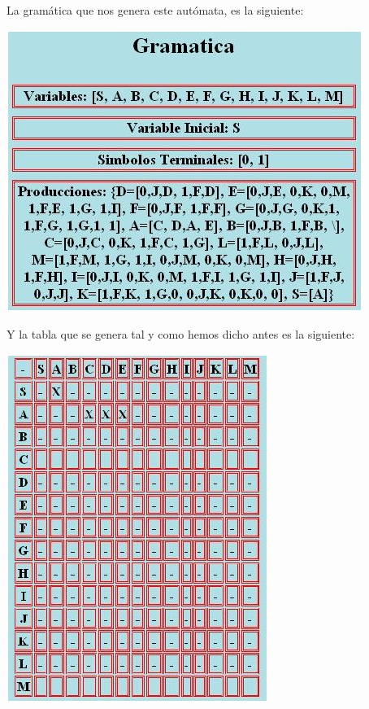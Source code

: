 \documentclass[12pt,a4paper,spanish]{book}
\begin{document}
La gram\'atica que nos genera este aut\'omata, es la siguiente:\\
\newline
\begin{center}
\includegraphics{gram1.jpg}
\end{center}
\newpage
Y la tabla que se genera tal y como hemos dicho antes es la siguiente:\\
\newline
\begin{center}
\includegraphics{gram2.jpg}
\end{center}
\end{document}
